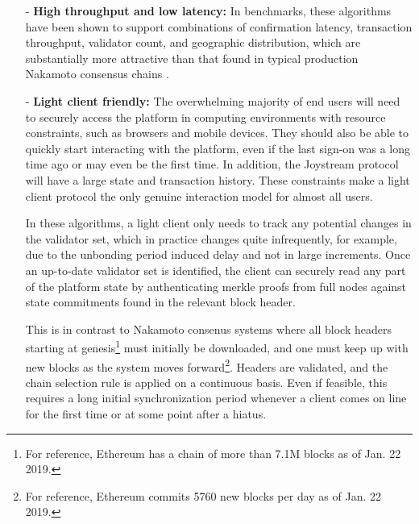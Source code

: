 \documentclass{article}
\begin{document}
\begin{itemize}

    \item[-] \textbf{High throughput and low latency:} In benchmarks, these algorithms have been shown to support combinations of confirmation latency, transaction throughput, validator count, and geographic distribution, which are substantially more attractive than that found in typical production Nakamoto consensus chains \cite{cosmos}.


    \item[-] \textbf{Light client friendly:} The overwhelming majority of end users will need to securely access the platform in computing environments with resource constraints, such as browsers and mobile devices. They should also be able to quickly start interacting with the platform, even if the last sign-on was a long time ago or may even be the first time. In addition, the Joystream protocol will have a large state and transaction history. These constraints make a light client protocol the only genuine interaction model for almost all users.

    In these algorithms, a light client only needs to track any potential changes in the validator set, which in practice changes quite infrequently, for example, due to the unbonding period induced delay and not in large increments. Once an up-to-date validator set is identified, the client can securely read any part of the platform state by authenticating merkle proofs from full nodes against state commitments found in the relevant block header.

    This is in contrast to Nakamoto consenus systems where all block headers starting at genesis\footnote{For reference, Ethereum has a chain of more than 7.1M blocks as of Jan. 22 2019.} must initially be downloaded, and one must keep up with new blocks as the system moves forward\footnote{For reference, Ethereum commits 5760 new blocks per day as of Jan. 22 2019.}. Headers are validated, and the chain selection rule is applied on a continuous basis. Even if feasible, this requires a long initial synchronization period whenever a client comes on line for the first time or at some point after a hiatus.



\end{itemize}
\end{document}
